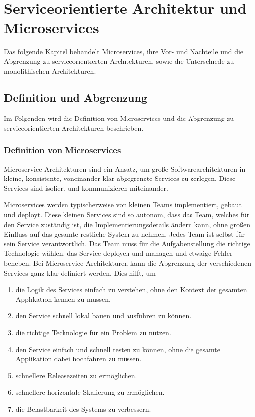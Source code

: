 \chapter{Serviceorientierte Architektur und Microservices}
Das folgende Kapitel behandelt Microservices, ihre Vor- und Nachteile und die Abgrenzung zu serviceorientierten Architekturen, sowie die Unterschiede zu monolithischen Architekturen.
\section{Definition und Abgrenzung}
Im Folgenden wird die Definition von Microservices und die Abgrenzung zu serviceorientierten Architekturen beschrieben.

\subsection{Definition von Microservices}
Microservice-Architekturen sind ein Ansatz, um große Softwarearchitekturen in kleine, konsistente, voneinander klar abgegrenzte Services zu zerlegen. Diese Services sind isoliert und kommunizieren miteinander. \cite[Kapitel 1]{MicroservicesForJavaDevelopers}

Microservices werden typischerweise von kleinen Teams implementiert, gebaut und deployt. Diese kleinen Services sind so autonom, dass das Team, welches für den Service zuständig ist, die Implementierungsdetails ändern kann, ohne großen Einfluss auf das gesamte restliche System zu nehmen.
Jedes Team ist selbst für sein Service verantwortlich. Das Team muss für die Aufgabenstellung die richtige Technologie wählen, das Service deployen und managen und etwaige Fehler beheben.
Bei Microservice-Architekturen kann die Abgrenzung der verschiedenen Services ganz klar definiert werden. \cite[Kapitel 1]{MicroservicesForJavaDevelopers} Dies hilft, um \cite[Kapitel 1]{MicroservicesForJavaDevelopers}
\begin{enumerate}[ref=\textbf{Punkt \arabic*}]
	\item \label{SOA:Abgrenzung:logik} die Logik des Services einfach zu verstehen, ohne den Kontext der gesamten Applikation kennen zu müssen.
	\item \label{SOA:Abgrenzung:bauen} den Service schnell lokal bauen und ausführen zu können.
	\item \label{SOA:Abgrenzung:technologie} die richtige Technologie für ein Problem zu nützen.
	\item \label{SOA:Abgrenzung:testen} den Service einfach und schnell testen zu können, ohne die gesamte Applikation dabei hochfahren zu müssen.
	\item \label{SOA:Abgrenzung:release} schnellere Releasezeiten zu ermöglichen.
	\item \label{SOA:Abgrenzung:skalierung} schnellere horizontale Skalierung zu ermöglichen.
	\item \label{SOA:Abgrenzung:belastbarkeit} die Belastbarkeit des Systems zu verbessern.
\end{enumerate}


